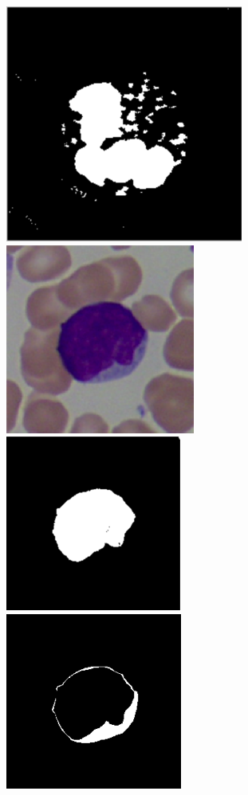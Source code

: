 \documentclass[final,a4paper,12pt,english]{UnicaPhdThesis3}
\begin{document}
\begin{figure}[!b]
	\includegraphics[height=0.10\textheight, width=0.10\textheight]{images/2015_1_caip/2-4}
	\includegraphics[height=0.10\textheight, width=0.10\textheight]{images/2015_1_caip/4-1}
	\includegraphics[height=0.10\textheight, width=0.10\textheight]{images/2015_1_caip/4-2}
	\includegraphics[height=0.10\textheight, width=0.10\textheight]{images/2015_1_caip/4-3}

\end{figure}
\end{document}
